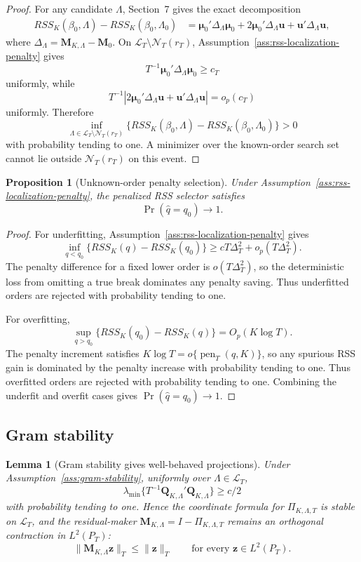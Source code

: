 \documentclass[12pt]{article}
\numberwithin{equation}{section}
\newtheorem{proposition}{Proposition}
\newtheorem{lemma}{Lemma}
\theoremstyle{definition}
\newcommand{\Op}{O_p}
\newcommand{\LtwoT}{L^2(P_T)}
\begin{document}
\begin{proof}
For any candidate \(\Lambda\), Section~7 gives the exact decomposition
\[
\begin{aligned}
    RSS_K(\beta_0,\Lambda)-RSS_K(\beta_0,\Lambda_0)
    &=\bm\mu_0'\Delta_\Lambda\bm\mu_0
      +2\bm\mu_0'\Delta_\Lambda\bm u
      +\bm u'\Delta_\Lambda\bm u,
\end{aligned}
\]
where \(\Delta_\Lambda=\bm M_{K,\Lambda}-\bm M_0\). On
\(\mathcal L_T\setminus\mathcal N_T(r_T)\), Assumption~\ref{ass:rss-localization-penalty}
gives
\[
    T^{-1}\bm\mu_0'\Delta_\Lambda\bm\mu_0\ge c_T
\]
uniformly, while
\[
    T^{-1}|2\bm\mu_0'\Delta_\Lambda\bm u+\bm u'\Delta_\Lambda\bm u|=o_p(c_T)
\]
uniformly. Therefore
\[
    \inf_{\Lambda\in\mathcal L_T\setminus\mathcal N_T(r_T)}
    \{RSS_K(\beta_0,\Lambda)-RSS_K(\beta_0,\Lambda_0)\}>0
\]
with probability tending to one. A minimizer over the known-order search set
cannot lie outside \(\mathcal N_T(r_T)\) on this event.
\end{proof}

\begin{proposition}[Unknown-order penalty selection]
\label{prop:part2-order-selection}
Under Assumption~\ref{ass:rss-localization-penalty}, the penalized RSS selector
satisfies
\[
    \Pr(\widehat q=q_0)\to1.
\]
\end{proposition}

\begin{proof}
For underfitting, Assumption~\ref{ass:rss-localization-penalty} gives
\[
    \inf_{q<q_0}\{RSS_K(q)-RSS_K(q_0)\}
    \ge cT\Delta_T^2+o_p(T\Delta_T^2).
\]
The penalty difference for a fixed lower order is
\(o(T\Delta_T^2)\), so the deterministic loss from omitting a true break
dominates any penalty saving. Thus underfitted orders are rejected with
probability tending to one.

For overfitting,
\[
    \sup_{q>q_0}\{RSS_K(q_0)-RSS_K(q)\}=\Op(K\log T).
\]
The penalty increment satisfies \(K\log T=o\{\operatorname{pen}_T(q,K)\}\), so
any spurious RSS gain is dominated by the penalty increase with probability
tending to one. Thus overfitted orders are rejected with probability tending to
one. Combining the underfit and overfit cases gives \(\Pr(\widehat q=q_0)\to1\).
\end{proof}
\subsection{Gram stability}

\begin{lemma}[Gram stability gives well-behaved projections]
\label{lem:part2-gram-stability}
Under Assumption~\ref{ass:gram-stability}, uniformly over
\(\Lambda\in\mathcal L_T\),
\[
    \lambda_{\min}\{T^{-1}\bm Q_{K,\Lambda}'\bm Q_{K,\Lambda}\}\ge c/2
\]
with probability tending to one. Hence the coordinate formula for
\(\Pi_{K,\Lambda,T}\) is stable on \(\mathcal L_T\), and the residual-maker
\(\bm M_{K,\Lambda}=I-\Pi_{K,\Lambda,T}\) remains an orthogonal contraction in
\(\LtwoT\):
\[
    \|\bm M_{K,\Lambda}\bm z\|_T\le \|\bm z\|_T
    \qquad \text{for every }\bm z\in\LtwoT.
\]
\end{lemma}
\end{document}
